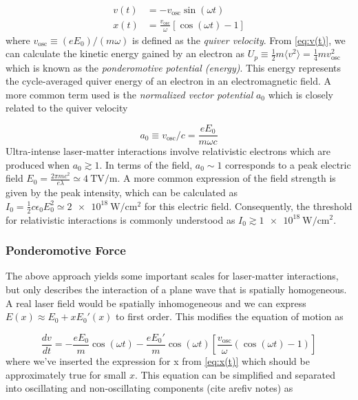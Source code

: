 \begin{align}
	v(t) &= - v_\text{osc} \sin(\omega t) \label{eq:v(t)} \\
	x(t) &= \frac{v_\text{osc}}{\omega} [\cos(\omega t) - 1] \label{eq:x(t)}
\end{align}
where $v_\text{osc} \equiv (e E_0) / (m \omega)$ is defined as the \emph{quiver velocity}. From \autoref{eq:v(t)}, we can calculate the kinetic energy gained by an electron as $U_p \equiv \frac{1}{2} m \langle v^2 \rangle = \frac{1}{4} m v_\text{osc}^2$ which is known as the \emph{ponderomotive potential (energy)}. This energy represents the cycle-averaged quiver energy of an electron in an electromagnetic field. A more common term used is the \emph{normalized vector potential} $a_0$ which is closely related to the quiver velocity

\begin{equation}
	a_0 \equiv v_\text{osc} / c = \frac{e E_0}{m \omega c} \label{eq:a0}
\end{equation}
Ultra-intense laser-matter interactions involve relativistic electrons which are produced when $a_0 \gtrsim 1$. In terms of the field, $a_0 \sim 1$ corresponds to a peak electric field $E_0 = \frac{2 \pi m c^2}{e \lambda} \simeq \SI{4}{\tera \volt \per \meter}$. A more common expression of the field strength is given by the peak intensity, which can be calculated as $I_0 = \frac{1}{2} c \epsilon_0 E_0^2 \simeq \SI{2e18}{\watt \per \centi \meter \squared}$ for this electric field. Consequently, the threshold for relativistic interactions is commonly understood as $I_0 \gtrsim \SI{1e18}{\watt \per \centi \meter \squared}$. 

\subsubsection{Ponderomotive Force}
The above approach yields some important scales for laser-matter interactions, but only describes the interaction of a plane wave that is spatially homogeneous. A real laser field would be spatially inhomogeneous and we can express $E(x) \approx E_0 + x E_0'(x)$ to first order. This modifies the equation of motion as 

\begin{equation}
	\frac{d v}{d t} = - \frac{e E_0}{m} \cos(\omega t) - \frac{e E_0'}{m} \cos(\omega t)[ \frac{v_\text{osc}}{\omega}(\cos(\omega t) - 1)]
\end{equation}
where we've inserted the expression for x from \cref{eq:x(t)} which should be approximately true for small $x$. This equation can be simplified and separated into oscillating and non-oscillating components (cite arefiv notes) as

